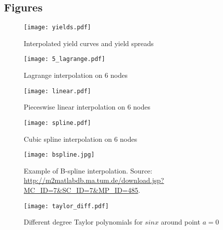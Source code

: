 \documentclass[a4paper,10pt]{article}
\begin{document}
\subsection*{Figures}

\begin{figure}[h!]
        \begin{minipage}[b]{0.5\linewidth}
            \centering
            \texttt{[image: yields.pdf]}
            \caption{Interpolated yield curves and yield spreads}
            \label{yields}
        \end{minipage}
        \hspace{0.5cm}
        \begin{minipage}[b]{0.5\linewidth}
            \centering
            \texttt{[image: 5\_lagrange.pdf]}
            \caption{Lagrange interpolation on 6 nodes}
            \label{lain}
        \end{minipage}
    \end{figure}


\begin{figure}[h!]
        \begin{minipage}[b]{0.5\linewidth}
            \centering
            \texttt{[image: linear.pdf]}
            \caption{Pieceswise linear interpolation on 6 nodes}
            \label{osnlin}
        \end{minipage}
        \hspace{0.5cm}
        \begin{minipage}[b]{0.5\linewidth}
            \centering
            \texttt{[image: spline.pdf]}
            \caption{Cubic spline interpolation on 6 nodes}
            \label{osnspl}
        \end{minipage}
    \end{figure}

\begin{figure}[h!]
        \begin{minipage}[b]{0.5\linewidth}
            \centering
            \texttt{[image: bspline.jpg]}
            \caption{Example of B-spline interpolation. Source: \protect\url{http://m2matlabdb.ma.tum.de/download.jsp?MC_ID=7&SC_ID=7&MP_ID=485}.}
            \label{bspl}
        \end{minipage}
        \hspace{0.5cm}
        \begin{minipage}[b]{0.5\linewidth}
            \centering
            \texttt{[image: taylor\_diff.pdf]}
            \caption{Different degree Taylor polynomials for $sinx$ around point $a=0$}
            \label{tay}
        \end{minipage}
    \end{figure}
\end{document}
